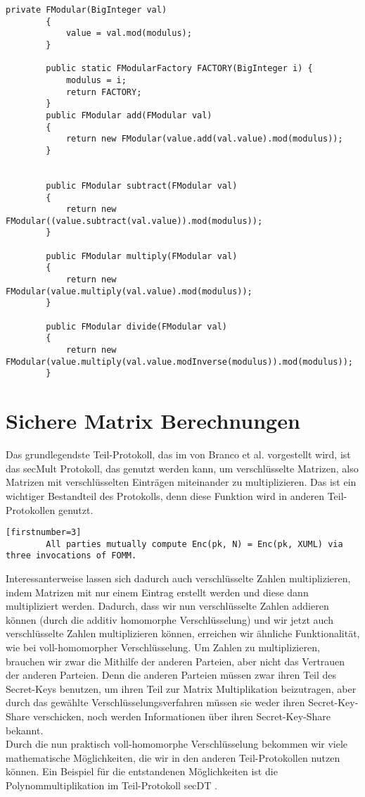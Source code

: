 \begin{lstlisting}[caption = {Ausschnitt aus der neu erstellten Klasse, die Berechnungen in beliebig großen Körpern erlaubt}]
        private FModular(BigInteger val)
        {
            value = val.mod(modulus);
        }

        public static FModularFactory FACTORY(BigInteger i) {
            modulus = i;
            return FACTORY;
        }
        public FModular add(FModular val)
        {
            return new FModular(value.add(val.value).mod(modulus));
        }
        
        
        public FModular subtract(FModular val)
        {
            return new FModular((value.subtract(val.value)).mod(modulus));
        }

        public FModular multiply(FModular val)
        {
            return new FModular(value.multiply(val.value).mod(modulus));
        }
        
        public FModular divide(FModular val)
        {
            return new FModular(value.multiply(val.value.modInverse(modulus)).mod(modulus));
        }
\end{lstlisting}


\section{Sichere Matrix Berechnungen}
Das grundlegendste Teil-Protokoll, das im von Branco et al. \cite{Doettling2021} vorgestellt wird, ist das secMult Protokoll, das genutzt werden kann, um verschlüsselte Matrizen, also Matrizen mit verschlüsselten Einträgen miteinander zu multiplizieren. Das ist ein wichtiger Bestandteil des Protokolls, denn diese Funktion wird in anderen Teil-Protokollen genutzt.\\
\begin{lstlisting}[caption = Ausschnitt aus dem secRank Teil-Protokoll \cite{Doettling2021}][firstnumber=3]
        All parties mutually compute Enc(pk, N) = Enc(pk, XUML) via three invocations of FOMM.
\end{lstlisting}
Interessanterweise lassen sich dadurch auch verschlüsselte Zahlen multiplizieren, indem Matrizen mit nur einem Eintrag erstellt werden und diese dann multipliziert werden. Dadurch, dass wir nun verschlüsselte Zahlen addieren können (durch die additiv homomorphe Verschlüsselung) und wir jetzt auch verschlüsselte Zahlen multiplizieren können, erreichen wir ähnliche Funktionalität, wie bei voll-homomorpher Verschlüsselung. Um Zahlen zu multiplizieren, brauchen wir zwar die Mithilfe der anderen Parteien, aber nicht das Vertrauen der anderen Parteien. Denn die anderen Parteien müssen zwar ihren Teil des Secret-Keys benutzen, um ihren Teil zur Matrix Multiplikation beizutragen, aber durch das gewählte Verschlüsselungsverfahren müssen sie weder ihren Secret-Key-Share verschicken, noch werden Informationen über ihren Secret-Key-Share bekannt.\\
Durch die nun praktisch voll-homomorphe Verschlüsselung bekommen wir viele mathematische Möglichkeiten, die wir in den anderen Teil-Protokollen nutzen können.
Ein Beispiel für die entstandenen Möglichkeiten ist die Polynommultiplikation im Teil-Protokoll secDT \cite{Doettling2021}.

